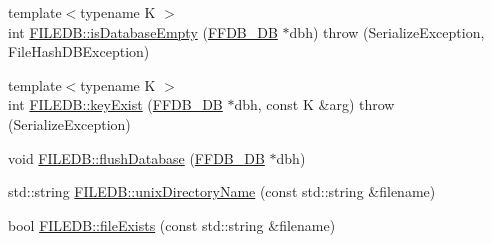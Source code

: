 \begin{DoxyCompactItemize}
\item 
{\footnotesize template$<$typename K $>$ }\\int \mbox{\hyperlink{namespaceFILEDB_a25ba56393bd11f7e104de43478a253de}{F\+I\+L\+E\+D\+B\+::is\+Database\+Empty}} (\mbox{\hyperlink{adat-devel_2other__libs_2filedb_2filehash_2ffdb__db_8h_a0b27b956926453a7a8141ea8e10f0df8}{F\+F\+D\+B\+\_\+\+DB}} $\ast$dbh)  throw (\+Serialize\+Exception, File\+Hash\+D\+B\+Exception)
\item 
{\footnotesize template$<$typename K $>$ }\\int \mbox{\hyperlink{namespaceFILEDB_a693e2659d01ea18edb88d796d7cbd5de}{F\+I\+L\+E\+D\+B\+::key\+Exist}} (\mbox{\hyperlink{adat-devel_2other__libs_2filedb_2filehash_2ffdb__db_8h_a0b27b956926453a7a8141ea8e10f0df8}{F\+F\+D\+B\+\_\+\+DB}} $\ast$dbh, const K \&arg)  throw (\+Serialize\+Exception)
\item 
void \mbox{\hyperlink{namespaceFILEDB_a28e01191edebd63edee882e8c7af9325}{F\+I\+L\+E\+D\+B\+::flush\+Database}} (\mbox{\hyperlink{adat-devel_2other__libs_2filedb_2filehash_2ffdb__db_8h_a0b27b956926453a7a8141ea8e10f0df8}{F\+F\+D\+B\+\_\+\+DB}} $\ast$dbh)
\item 
std\+::string \mbox{\hyperlink{namespaceFILEDB_a7e76510d94991fb0a4e18acc02214900}{F\+I\+L\+E\+D\+B\+::unix\+Directory\+Name}} (const std\+::string \&filename)
\item 
bool \mbox{\hyperlink{namespaceFILEDB_ae588550e41a7b104b78a0e81ceb24a46}{F\+I\+L\+E\+D\+B\+::file\+Exists}} (const std\+::string \&filename)
\end{DoxyCompactItemize}

